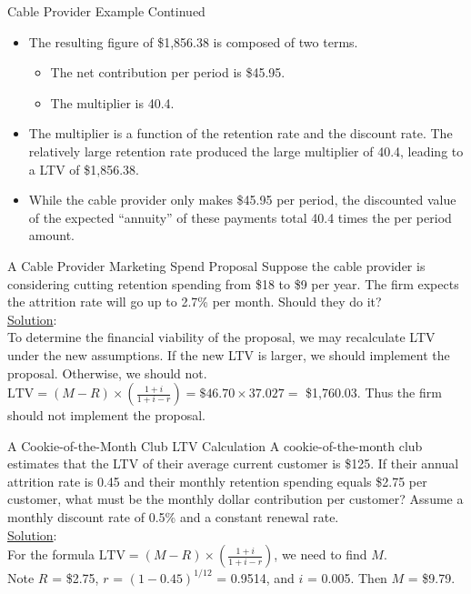 \documentclass[pdf]{beamer}
\theoremstyle{remark}
\theoremstyle{definition}
\begin{document}
\begin{frame}[t]{Cable Provider Example Continued}
\begin{itemize}
\item The resulting figure of  \$1,856.38 is composed of two terms.
\begin{itemize}
  \item The net contribution per period is \$45.95.
  \item The multiplier is 40.4.
\end{itemize}
\item The multiplier is a function of the retention rate and the discount rate. The relatively large retention rate produced the large multiplier of 40.4, leading to a LTV of \$1,856.38.
\item While the cable provider only makes \$45.95 per period, the discounted value of the expected ``annuity'' of these payments total 40.4 times the per period amount.
\end{itemize}
\end{frame}

\begin{frame}[t]{A Cable Provider Marketing Spend Proposal}
Suppose the cable provider is considering cutting retention spending from \$18 to \$9 per year.  The firm expects the attrition rate will go up to 2.7\% per month. Should they do it? \\
\vspace{1.5ex}
\underline{Solution}:\\
\vspace{1.5ex}
To determine the financial viability of the proposal, we may recalculate LTV under the new assumptions. If the new LTV is larger, we should implement the proposal. Otherwise, we should not. \\
\vspace{1.5ex}
$\text{LTV} = (M - R) \times ( \frac{1+i}{1+i-r} ) = \$46.70 
\times 37.027 = $ \$1,760.03.  Thus the firm should not implement the proposal.  
 \end{frame}

\begin{frame}[t]{A Cookie-of-the-Month Club LTV Calculation}
A cookie-of-the-month club estimates that the LTV of their average current customer is \$125.
If their annual attrition rate is 0.45 and their monthly retention spending equals \$2.75 per customer, what must be the monthly dollar contribution per customer? Assume a monthly discount rate of 0.5\% and a constant renewal rate. \\
\vspace{1.5ex}
\underline{Solution}:\\
\vspace{1.5ex}
For the formula $\text{LTV} = (M - R) \times ( \frac{1+i}{1+i-r} )$, we need to find $M$.  \\
\vspace{1.5ex}
Note $R$ = \$2.75,  $r$ = $(1-0.45)^{1/12}$ = 0.9514, and $i$ = 0.005.  Then $M$ = \$9.79. 
\end{frame}
\end{document}
